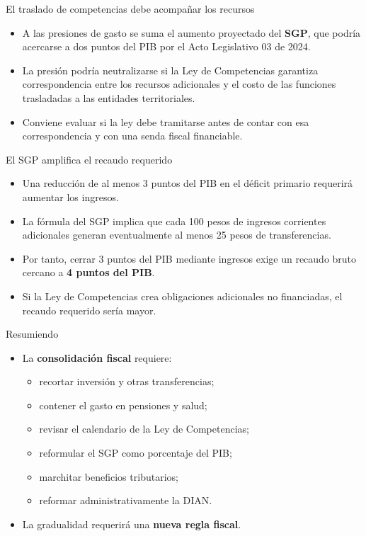 \begin{frame}{El traslado de competencias debe acompañar los recursos}
\begin{itemize}
  \item A las presiones de gasto se suma el aumento proyectado del \textbf{SGP}, que podría acercarse a dos puntos del PIB por el Acto Legislativo 03 de 2024.
  \item La presión podría neutralizarse si la Ley de Competencias garantiza correspondencia entre los recursos adicionales y el costo de las funciones trasladadas a las entidades territoriales.
  \item Conviene evaluar si la ley debe tramitarse antes de contar con esa correspondencia y con una senda fiscal financiable.
\end{itemize}
\end{frame}

\begin{frame}{El SGP amplifica el recaudo requerido}
\begin{itemize}
  \item Una reducción de al menos 3 puntos del PIB en el déficit primario requerirá aumentar los ingresos.
  \item La fórmula del SGP implica que cada 100 pesos de ingresos corrientes adicionales generan eventualmente al menos 25 pesos de transferencias.
  \item Por tanto, cerrar 3 puntos del PIB mediante ingresos exige un recaudo bruto cercano a \textbf{4 puntos del PIB}.
  \item Si la Ley de Competencias crea obligaciones adicionales no financiadas, el recaudo requerido sería mayor.
\end{itemize}
\end{frame}

\begin{frame}{Resumiendo}
\begin{itemize}
  \item La \textbf{consolidación fiscal} requiere:
  \begin{itemize}
    \item recortar inversión y otras transferencias;
    \item contener el gasto en pensiones y salud;
    \item revisar el calendario de la Ley de Competencias;
    \item reformular el SGP como porcentaje del PIB;
    \item marchitar beneficios tributarios;
    \item reformar administrativamente la DIAN.
  \end{itemize}
  \item La gradualidad requerirá una \textbf{nueva regla fiscal}.
\end{itemize}
\end{frame}


